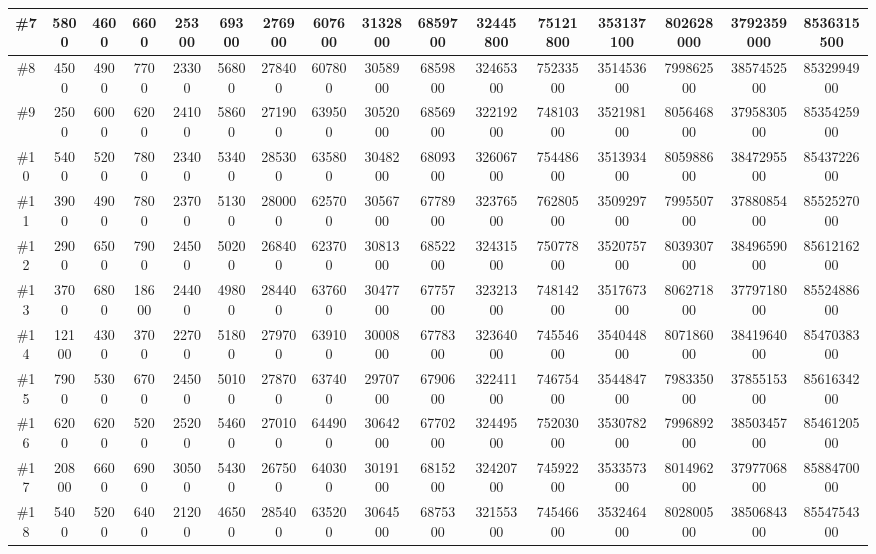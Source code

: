 \documentclass[titlepage]{article}
\begin{document}
\begin{landscape}
\begin{table}
\begin{tabular}{|c|c|c|c|c|c|c|c|c|c|c|c|c|c|c|c|}
				\hline
				\#7      & 5800   & 4600  & 6600  & 25300 & 69300 & 276900 & 607600 & 3132800 & 6859700 & 32445800 & 75121800 & 353137100 & 802628000 & 3792359000 & 8536315500  \\ 
				\hline
				\#8      & 4500   & 4900  & 7700  & 23300 & 56800 & 278400 & 607800 & 3058900 & 6859800 & 32465300 & 75233500 & 351453600 & 799862500 & 3857452500 & 8532994900  \\ 
				\hline
				\#9      & 2500   & 6000  & 6200  & 24100 & 58600 & 271900 & 639500 & 3052000 & 6856900 & 32219200 & 74810300 & 352198100 & 805646800 & 3795830500 & 8535425900  \\ 
				\hline
				\#10     & 5400   & 5200  & 7800  & 23400 & 53400 & 285300 & 635800 & 3048200 & 6809300 & 32606700 & 75448600 & 351393400 & 805988600 & 3847295500 & 8543722600  \\ 
				\hline
				\#11     & 3900   & 4900  & 7800  & 23700 & 51300 & 280000 & 625700 & 3056700 & 6778900 & 32376500 & 76280500 & 350929700 & 799550700 & 3788085400 & 8552527000  \\ 
				\hline
				\#12     & 2900   & 6500  & 7900  & 24500 & 50200 & 268400 & 623700 & 3081300 & 6852200 & 32431500 & 75077800 & 352075700 & 803930700 & 3849659000 & 8561216200  \\ 
				\hline
				\#13     & 3700   & 6800  & 18600 & 24400 & 49800 & 284400 & 637600 & 3047700 & 6775700 & 32321300 & 74814200 & 351767300 & 806271800 & 3779718000 & 8552488600  \\ 
				\hline
				\#14     & 12100  & 4300  & 3700  & 22700 & 51800 & 279700 & 639100 & 3000800 & 6778300 & 32364000 & 74554600 & 354044800 & 807186000 & 3841964000 & 8547038300  \\ 
				\hline
				\#15     & 7900   & 5300  & 6700  & 24500 & 50100 & 278700 & 637400 & 2970700 & 6790600 & 32241100 & 74675400 & 354484700 & 798335000 & 3785515300 & 8561634200  \\ 
				\hline
				\#16     & 6200   & 6200  & 5200  & 25200 & 54600 & 270100 & 644900 & 3064200 & 6770200 & 32449500 & 75203000 & 353078200 & 799689200 & 3850345700 & 8546120500  \\ 
				\hline
				\#17     & 20800  & 6600  & 6900  & 30500 & 54300 & 267500 & 640300 & 3019100 & 6815200 & 32420700 & 74592200 & 353357300 & 801496200 & 3797706800 & 8588470000  \\ 
				\hline
				\#18     & 5400   & 5200  & 6400  & 21200 & 46500 & 285400 & 635200 & 3064500 & 6875300 & 32155300 & 74546600 & 353246400 & 802800500 & 3850684300 & 8554754300  \\ 

\end{tabular}
\end{table}
\end{landscape}
\end{document}
